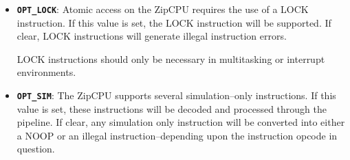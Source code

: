 \documentclass{gqtekspec}
\begin{document}
\begin{itemize}
\item {\bf\tt OPT\_LOCK}: Atomic access on the ZipCPU requires the use of a
	LOCK instruction.  If this value is set, the LOCK instruction will be
	supported.  If clear, LOCK instructions will generate illegal
	instruction errors.

	LOCK instructions should only be necessary in multitasking or
	interrupt environments.

\item {\bf\tt OPT\_SIM}: The ZipCPU supports several simulation--only
	instructions.  If this value is set, these instructions will be
	decoded and processed through the pipeline.  If clear, any simulation
	only instruction will be converted into either a NOOP or an illegal
	instruction--depending upon the instruction opcode in question.
\end{itemize}
\end{document}
